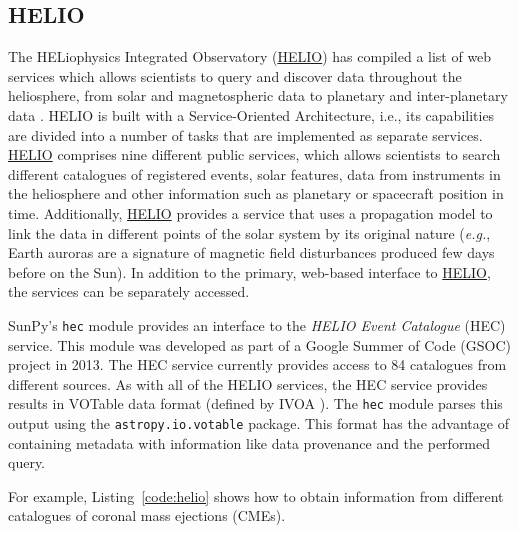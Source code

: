 \subsection{HELIO}\label{ssec:helio}

The HELiophysics Integrated Observatory (\href{http://helio-vo.eu}{HELIO}) has 
compiled a list of web services which allows scientists to query and 
discover data throughout the heliosphere, from solar and magnetospheric data to planetary and 
inter-planetary data \citep{dps2012}.
HELIO is built with a Service-Oriented Architecture, 
i.e., its capabilities are divided into a number of tasks that are 
implemented as separate services. 
\href{http://helio-vo.eu}{HELIO} comprises nine different public services, 
which allows scientists to search different catalogues of registered events, 
solar features, data from instruments in the heliosphere and other information 
such as planetary or spacecraft position in time. 
Additionally, \href{http://helio-vo.eu}{HELIO} provides a service that uses a 
propagation model to link the data in different points of the solar system by 
its original nature (\textit{e.g.}, Earth auroras are a signature of magnetic 
field disturbances produced few days before on the Sun).
In addition to the primary, web-based interface to 
\href{http://helio-vo.eu}{HELIO}, the services can be separately accessed.

SunPy's \texttt{hec} module provides an interface to the
\textit{HELIO Event Catalogue} (HEC) service. This module was developed as
part of a Google Summer of Code (GSOC) project in 2013.
The HEC service currently provides access to 84 catalogues from different
sources.
As with all of the HELIO services, the HEC service provides results in VOTable 
data format (defined by IVOA \cite{ochsenbein_ivoa_2011}). The \texttt{hec}
module parses this output using the \texttt{astropy.io.votable} package.
This format has the advantage of containing metadata with information like
data provenance and the performed query.

For example, Listing~\ref{code:helio} shows how to obtain information
from different catalogues of coronal mass ejections (CMEs).

